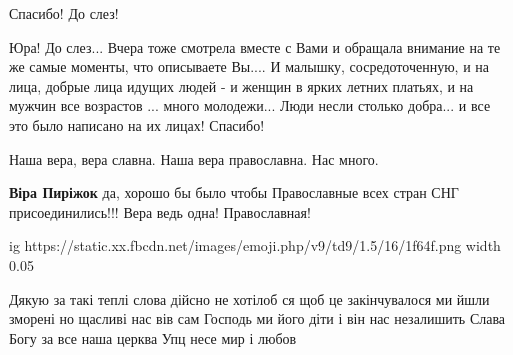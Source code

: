 \begin{itemize}
Спасибо! До слез!

 

Юра! До слез... Вчера тоже смотрела вместе с Вами и обращала внимание на те же
самые моменты, что описываете Вы.... И малышку, сосредоточенную, и на лица, добрые
лица идущих людей - и женщин в ярких летних платьях, и на мужчин все возрастов
... много молодежи... Люди несли столько добра... и все это было написано на их
лицах! Спасибо!

 
Наша вера, вера славна. Наша вера православна. Нас много.

\begin{itemize}
 
\textbf{Віра Пиріжок} да, хорошо бы было чтобы Православные всех стран СНГ присоединились!!! Вера ведь одна! Православная!

\ifcmt
  ig https://static.xx.fbcdn.net/images/emoji.php/v9/td9/1.5/16/1f64f.png
  width 0.05
\fi

\end{itemize}

 

Дякую за такі теплі слова дійсно не хотілоб ся щоб це закінчувалося ми йшли
зморені но щасливі нас вів сам Господь ми його діти і він нас незалишить Слава
Богу за все наша церква Упц несе мир і любов

\begin{itemize}
 

\end{itemize}
\end{itemize}

